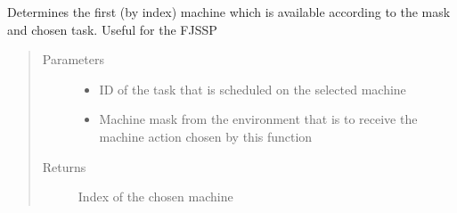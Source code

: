 \documentclass[letterpaper,10pt,english]{sphinxmanual}
\begin{document}
\begin{fulllineitems}
\label{\detokenize{agents.heuristic:agents.heuristic.heuristic_agent.choose_first_machine}}
\sphinxAtStartPar
Determines the first (by index) machine which is available according to the mask and chosen task. Useful for the
FJSSP
\begin{quote}\begin{description}
\item[{Parameters}] \leavevmode\begin{itemize}
\item {} 
\sphinxAtStartPar
{} \textendash{} ID of the task that is scheduled on the selected machine

\item {} 
\sphinxAtStartPar
{} \textendash{} Machine mask from the environment that is to receive the machine action chosen by this function

\end{itemize}

\item[{Returns}] \leavevmode
\sphinxAtStartPar
Index of the chosen machine

\end{description}\end{quote}

\end{fulllineitems}

\end{document}
